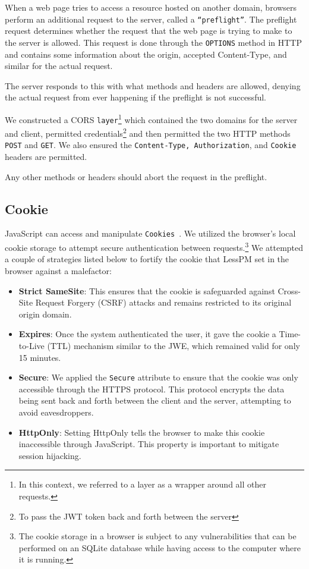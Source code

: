 When a web page tries to access a resource hosted on another domain, browsers
perform an additional request to the server, called a \texttt{``preflight''}.
The preflight request determines whether the
request that the web page is trying to make to the server is allowed.
This request is done through the \texttt{OPTIONS} method in HTTP and contains
some information about the origin, accepted Content-Type, and similar for the
actual request.

The server responds to this with what methods and headers are allowed, denying
the actual request from ever happening if the preflight is not successful.

We constructed a CORS \texttt{layer}\footnote{
  In this context, we referred to a layer as a wrapper around all other
  requests.
} which contained the two domains for the server and client, permitted
credentials\footnote{
  To pass the JWT token back and forth between the server
} and then permitted the two HTTP methods \texttt{POST} and \texttt{GET}.
We also ensured the \texttt{Content-Type, Authorization}, and \texttt{Cookie}
headers are permitted.

Any other methods or headers should abort the request in the preflight.

\subsection{Cookie}\label{subsec:cookie}
JavaScript can access and manipulate \texttt{Cookies}~\cite{he2019malicious}.
We utilized the browser's local cookie storage to attempt secure authentication
between requests.\footnote{
  The cookie storage in a browser is subject to any vulnerabilities that can be
  performed on an SQLite database while having access to the computer where it
  is running.
}
We attempted a couple of strategies listed below to fortify the cookie that
LessPM set in the browser against a malefactor:
\begin{itemize}
  \item \textbf{Strict SameSite}:
  This ensures that the cookie is safeguarded against Cross-Site Request Forgery
  (CSRF) attacks and remains restricted to its original origin domain.
  \item \textbf{Expires}:
  Once the system authenticated the user, it gave the cookie a Time-to-Live
  (TTL) mechanism similar to the JWE, which remained valid for only 15 minutes.
  \item \textbf{Secure}:
  We applied the \texttt{Secure} attribute to ensure that the cookie was only
  accessible through the HTTPS protocol.
  This protocol encrypts the data being sent back and forth between the client
  and the server, attempting to avoid eavesdroppers.
  \item \textbf{HttpOnly}:
  Setting HttpOnly tells the browser to make this cookie inaccessible through
  JavaScript.
  This property is important to mitigate session hijacking.
\end{itemize}

